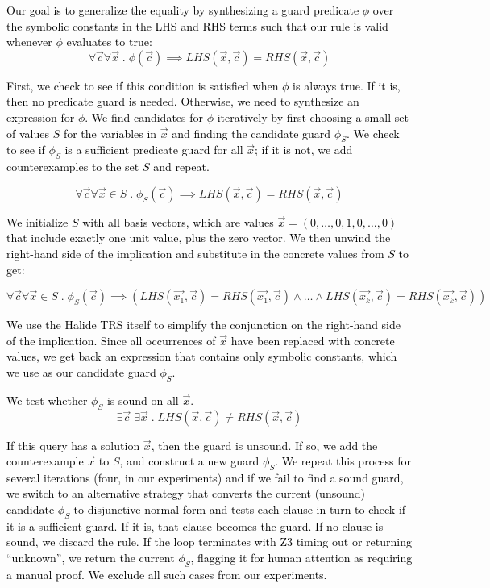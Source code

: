 \documentclass[acmsmall,review]{acmart}\settopmatter{printfolios=true,printccs=false,printacmref=false}
\newcommand{\modified}[1]{\textcolor{black}{{#1}}}
\begin{document}
\modified{Our goal is to generalize the equality by synthesizing a guard predicate $\phi$ 
over the symbolic constants in the LHS and RHS terms such that our rule is valid whenever
$\phi$ evaluates to true: }
\[ \forall \vec{c} \forall \vec{x} \;.\; \phi(\vec{c}) \implies LHS(\vec{x},\vec{c}) = RHS(\vec{x},\vec{c})
\]

\modified{First, we check to see if this condition is satisfied when $\phi$ is 
always true. If it is, then no predicate guard is needed. Otherwise, we need 
to synthesize an expression for $\phi$. We find candidates for $\phi$ iteratively 
by first choosing a small set of values $S$ for the variables 
in $\vec{x}$ and finding the candidate guard $\phi_S$. We check to see if $\phi_S$
is a sufficient predicate guard for all $\vec{x}$; if it is not, we add
counterexamples to the set $S$ and repeat.}

\[ \forall \vec{c} \forall \vec{x} \in S \;.\; \phi_S(\vec{c}) \implies LHS(\vec{x},\vec{c}) = RHS(\vec{x},\vec{c})
\]

\modified{We initialize $S$ with all basis vectors, which are 
values $\vec{x} = ( 0, \ldots, 0, 1, 0, \ldots, 0 )$ that include exactly one unit value,
plus the zero vector.  
We then unwind the right-hand side of the implication and substitute in the concrete values 
from $S$ to get:}

\[ \forall \vec{c} \forall \vec{x} \in S \;.\; \phi_S(\vec{c}) \implies (LHS(\vec{x_1},\vec{c}) = RHS(\vec{x_1},\vec{c}) \wedge \ldots \wedge
LHS(\vec{x_k},\vec{c}) = RHS(\vec{x_k},\vec{c}))
\]

\modified{We use the Halide TRS itself to simplify the conjunction on the right-hand side of the
implication. Since all occurrences of $\vec{x}$ have been replaced with concrete
values, we get back an expression that contains only symbolic constants, which we
use as our candidate guard $\phi_S$. }

\modified{We test whether $\phi_S$ is sound on all $\vec{x}$. }
\[ \exists \vec{c} \; \exists \vec{x} 
   \;.\; LHS(\vec{x},\vec{c}) \not= RHS(\vec{x},\vec{c})
\]

\modified{If this query has a solution $\vec{x}$, then the guard is unsound.  
If so, we add the counterexample $\vec{x}$ to $S$, and construct a new guard $\phi_S$.  
We repeat this process for several iterations (four, in our experiments) and if 
we fail to find a sound guard, we switch to an alternative strategy that converts 
the current (unsound) candidate $\phi_S$ to disjunctive normal form and tests
each clause in turn to check if it is a sufficient guard.
If it is, that clause becomes the guard.  If no clause is sound, we discard the rule.
If the loop terminates with Z3 timing out or returning ``unknown'', we return
the current $\phi_S$, flagging it for human attention as requiring a manual proof. 
We exclude all such cases from our experiments.}
\end{document}
